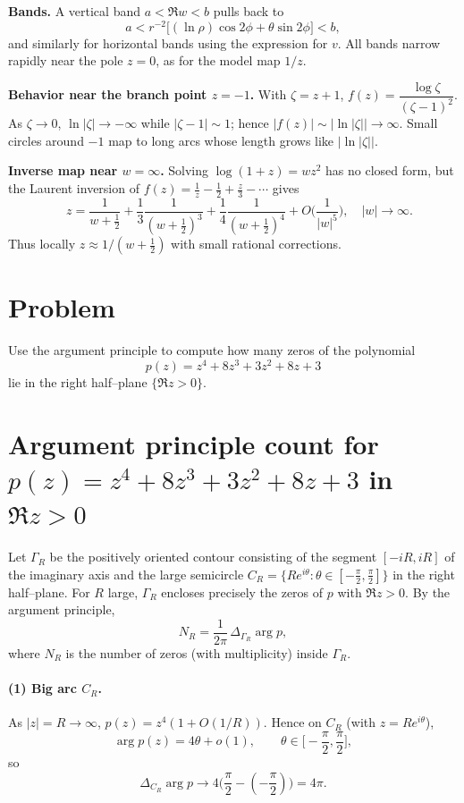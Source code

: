 \documentclass[12pt,a4paper]{article}
\begin{document}
	\medskip
	\textbf{Bands.}
	A vertical band \(a<\Re w<b\) pulls back to
	\[
	a<r^{-2}\bigl[(\ln\rho)\cos 2\phi+\theta\sin 2\phi\bigr]<b,
	\]
	and similarly for horizontal bands using the expression for \(v\).
	All bands narrow rapidly near the pole \(z=0\), as for the model map \(1/z\).
	
	\medskip
	\textbf{Behavior near the branch point \(z=-1\).}
	With \(\zeta=z+1\), \(f(z)=\dfrac{\log\zeta}{(\zeta-1)^{2}}\).
	As \(\zeta\to 0\), \(\ln|\zeta|\to -\infty\) while \(|\zeta-1|\sim 1\);
	hence \(|f(z)|\sim |\ln|\zeta||\to\infty\).
	Small circles around \(-1\) map to long arcs whose length grows like \( |\ln|\zeta|| \).
	
	\medskip
	\textbf{Inverse map near \(w=\infty\).}
	Solving \(\log(1+z)=w z^{2}\) has no closed form, but the Laurent inversion of
	\(f(z)=\tfrac1z-\tfrac12+\tfrac{z}{3}-\cdots\) gives
	\[
	\boxed{\quad
		z=\frac{1}{w+\tfrac12}+\frac{1}{3}\frac{1}{(w+\tfrac12)^{3}}
		+\frac{1}{4}\frac{1}{(w+\tfrac12)^{4}}
		+O\!\Big(\frac{1}{|w|^{5}}\Big),
		\quad |w|\to\infty. }
	\]
	Thus locally \(z\approx 1/(w+\tfrac12)\) with small rational corrections.

\section*{Problem}
Use the argument principle to compute how many zeros of the polynomial
\[
p(z)=z^{4}+8z^{3}+3z^{2}+8z+3
\]
lie in the right half–plane \(\{\Re z>0\}\).
	
\section*{Argument principle count for \(p(z)=z^4+8z^3+3z^2+8z+3\) in \(\Re z>0\)}

Let \(\Gamma_R\) be the positively oriented contour consisting of the segment
\([-iR,iR]\) of the imaginary axis and the large semicircle
\(C_R=\{Re^{i\theta}:\theta\in[-\frac{\pi}{2},\frac{\pi}{2}]\}\) in the right half–plane.
For \(R\) large, \(\Gamma_R\) encloses precisely the zeros of \(p\) with \(\Re z>0\).
By the argument principle,
\[
N_R=\frac{1}{2\pi}\,\Delta_{\Gamma_R}\arg p,
\]
where \(N_R\) is the number of zeros (with multiplicity) inside \(\Gamma_R\).

\paragraph{(1) Big arc \(C_R\).}
As \(|z|=R\to\infty\),
\(
p(z)=z^4(1+O(1/R)).
\)
Hence on \(C_R\) (with \(z=Re^{i\theta}\)),
\[
\arg p(z)=4\theta+o(1),\qquad \theta\in\Big[-\frac{\pi}{2},\frac{\pi}{2}\Big],
\]
so
\[
\Delta_{C_R}\arg p \longrightarrow 4\Big(\frac{\pi}{2}-(-\frac{\pi}{2})\Big)=4\pi.
\]
\end{document}
